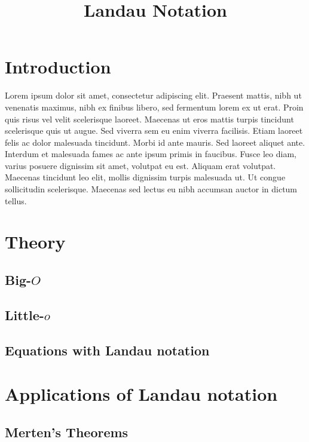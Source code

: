 \documentclass{article}
\title{Landau Notation}
\date{}
\begin{document}
\maketitle

\section{Introduction}\label{sec:introduction}

Lorem ipsum dolor sit amet, consectetur adipiscing elit. Praesent mattis, nibh ut venenatis maximus, nibh ex finibus libero, sed fermentum lorem ex ut erat. Proin quis risus vel velit scelerisque laoreet. Maecenas ut eros mattis turpis tincidunt scelerisque quis ut augue. Sed viverra sem eu enim viverra facilisis. Etiam laoreet felis ac dolor malesuada tincidunt. Morbi id ante mauris. Sed laoreet aliquet ante. Interdum et malesuada fames ac ante ipsum primis in faucibus. Fusce leo diam, varius posuere dignissim sit amet, volutpat eu est. Aliquam erat volutpat. Maecenas tincidunt leo elit, mollis dignissim turpis malesuada ut. Ut congue sollicitudin scelerisque. Maecenas sed lectus eu nibh accumsan auctor in dictum tellus.

\section{Theory}\label{sec:theory}

\subsection{Big-$O$}\label{ssec:bigo}

\subsection{Little-$o$}\label{ssec:littleo}

\subsection{Equations with Landau notation}\label{ssec:equations}

\section{Applications of Landau notation}\label{sec:applications}

\subsection{Merten's Theorems}\label{ssec:merten}
\end{document}
